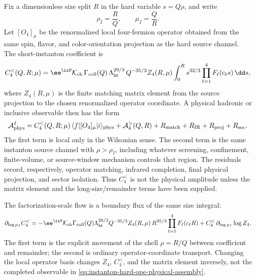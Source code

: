Fix a dimensionless size split \(R\) in the hard variable \(s=Q\rho\), and
write
\[
  \rho_I=\frac{R}{Q},
  \qquad
  \mu_I=\frac{Q}{R}.
\]
Let \([O_4]_\mu\) be the renormalized local four-fermion operator obtained
from the same spin, flavor, and color-orientation projection as the hard
source channel.  The short-instanton coefficient is
\begin{equation}
  C_{4}^{<}(Q,R;\mu)
  =
  \ee^{\ii\theta}
  \mathcal K_{\rm ch}\,
  \Gamma_{\rm coll}(Q)\,
  \Lambda_{\rm ht}^{29/3}\,
  Q^{-35/3}
  Z_{4}(R,\mu)
  \int_0^{R}
    s^{32/3}\prod_{\ell=1}^{4}F_\ell(c_\ell s)\,\dd s ,
  \label{eq:instanton-hard-short-ope-coefficient}
\end{equation}
where \(Z_4(R,\mu)\) is the finite matching matrix element from the source
projection to the chosen renormalized operator coordinate.  A physical
hadronic or inclusive observable then has the form
\begin{equation}
  \mathcal A_{\rm phys}^{I}
  =
  C_{4}^{<}(Q,R;\mu)\,
  \langle f|[O_4]_\mu|i\rangle_{\rm phys}
  +
  \mathcal A_{4}^{>}(Q,R)
  +
  R_{\rm match}+R_{\rm IR}+R_{\rm proj}+R_{\rm sec}.
  \label{eq:instanton-hard-ope-physical-assembly}
\end{equation}
The first term is local only in the Wilsonian sense.  The second term is the
same instanton source channel with \(\rho>\rho_I\), including whatever
screening, confinement, finite-volume, or source-window mechanism controls
that region.  The residuals record, respectively, operator matching, infrared
completion, final physical projection, and sector isolation.  Thus
\(C_4^{<}\) is not the physical amplitude unless the matrix element and the
long-size/remainder terms have been supplied.

The factorization-scale flow is a boundary flux of the same size integral:
\begin{equation}
  \partial_{\log\mu_I}C_4^{<}
  =
  -\ee^{\ii\theta}
  \mathcal K_{\rm ch}
  \Gamma_{\rm coll}(Q)
  \Lambda_{\rm ht}^{29/3}
  Q^{-35/3}
  Z_{4}(R,\mu)\,
  R^{35/3}\prod_{\ell=1}^{4}F_\ell(c_\ell R)
  +
  C_4^{<}\,\partial_{\log\mu_I}\log Z_4 .
  \label{eq:instanton-hard-short-ope-boundary-flow}
\end{equation}
The first term is the explicit movement of the shell
\(\rho=R/Q\) between coefficient and remainder; the second is ordinary
operator-coordinate transport.  Changing the local operator basis changes
\(Z_4\), \(C_4^{<}\), and the matrix element inversely, not the completed
observable in \eqref{eq:instanton-hard-ope-physical-assembly}.

